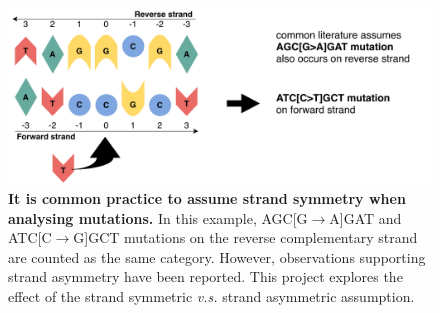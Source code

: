 \begin{figure}[h!]
    \centering
    \includegraphics[scale=0.78]{graphics/motif_symmetric_demo.pdf}
    \caption{\textbf{It is common practice to assume strand symmetry when analysing mutations.} In this example, AGC[G$\rightarrow$A]GAT and ATC[C$\rightarrow$G]GCT mutations on the reverse complementary strand are counted as the same category. However, observations supporting strand asymmetry have been reported. This project explores the effect of the strand symmetric \textit{v.s.} strand asymmetric assumption.}
    \label{fig:motif_symmetric_demo}
\end{figure}
